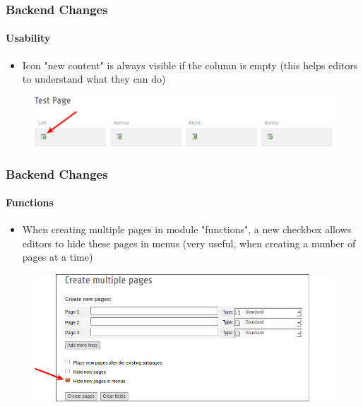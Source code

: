 
\begin{frame}[fragile]
	\frametitle{Backend Changes}
	\framesubtitle{Usability}

 	\begin{itemize}
		\item Icon "new content" is always visible if the column is empty\newline
			\small(this helps editors to understand what they can do)\normalsize
	\end{itemize}

	\begin{figure}
		\includegraphics[width=0.95\linewidth]{Images/BackendChanges/NewContentIconAlwaysVisible.png}
	\end{figure}

\end{frame}


\begin{frame}[fragile]
	\frametitle{Backend Changes}
	\framesubtitle{Functions}

 	\begin{itemize}
		\item When creating multiple pages in module "functions", a new checkbox allows editors to hide these pages in menus\newline
			\small(very useful, when creating a number of pages at a time)\normalsize
	\end{itemize}

	\begin{figure}
		\includegraphics[width=0.85\linewidth]{Images/BackendChanges/CreateMultiplePagesHideInMenu.png}
	\end{figure}

\end{frame}

